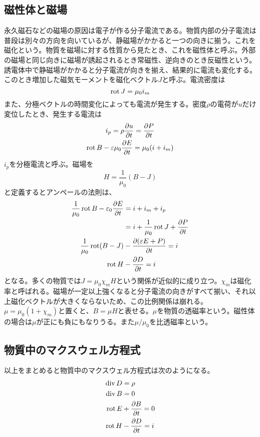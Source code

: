 \subsection{磁性体と磁場}
    永久磁石などの磁場の原因は電子が作る分子電流である。物質内部の分子電流は普段は別々の方向を向いているが、静磁場がかかると一つの向きに揃う。これを磁化という。物質を磁場に対する性質から見たとき、これを磁性体と呼ぶ。外部の磁場と同じ向きに磁場が誘起されるとき常磁性、逆向きのとき反磁性という。誘電体中で静磁場がかかると分子電流が向きを揃え、結果的に電流も変化する。このとき増加した磁気モーメントを磁化ベクトル$J$と呼ぶ。電流密度は
        \[\operatorname{rot} J = \mu_0i_m\]
    また、分極ベクトルの時間変化によっても電流が発生する。密度$\rho$の電荷が$u$だけ変位したとき、発生する電流は
    \begin{gather*}
        i_p = \rho\pdv{u}{t} = \pdv{P}{t}\\
        \operatorname{rot} B - \varepsilon\mu_0\pdv{E}{t} = \mu_0 (i + i_m)
    \end{gather*}
    $i_p$を分極電流と呼ぶ。磁場を
        \[H = \frac{1}{\mu_0}(B - J)\]
    と定義するとアンペールの法則は、
    \begin{align*}
        \frac{1}{\mu_0}\operatorname{rot} B - \varepsilon_0 \pdv{E}{t}
            &= i + i_m + i_p\\
            &= i + \frac{1}{\mu_0}\operatorname{rot} J + \pdv{P}{t}\\
        \frac{1}{\mu_0}\operatorname{rot}(B - J) &- \pdv{(\varepsilon E + P)}{t} = i\\
        \operatorname{rot} H &- \pdv{D}{t} = i
    \end{align*}
    となる。多くの物質では$J = \mu_0\chi_m H$という関係が近似的に成り立つ。$\chi_m$は磁化率と呼ばれる。磁場が一定以上強くなると分子電流の向きがすべて揃い、それ以上磁化ベクトルが大きくならないため、この比例関係は崩れる。$\mu = \mu_0(1 + \chi_m)$と置くと、$B = \mu H$と表せる。$\mu$を物質の透磁率という。磁性体の場合は$\mu$が正にも負にもなりうる。また$\mu / \mu_0$を比透磁率という。

\subsection{物質中のマクスウェル方程式}
    以上をまとめると物質中のマクスウェル方程式は次のようになる。
    \begin{align*}
        \operatorname{div} D &= \rho\\
        \operatorname{div} B &= 0\\
        \operatorname{rot} E &+ \pdv{B}{t} = 0\\
        \operatorname{rot} H &- \pdv{D}{t} =  i
    \end{align*}